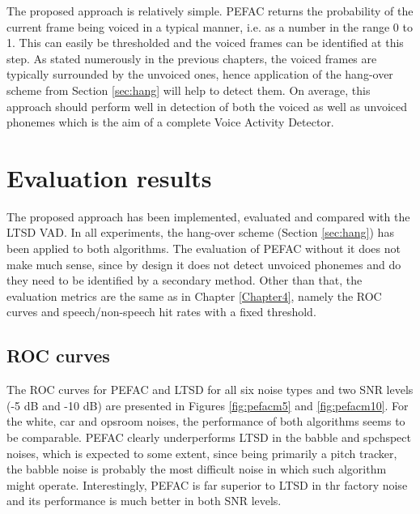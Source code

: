 The proposed approach is relatively simple. PEFAC returns the probability of the current frame being voiced in a typical manner, i.e. as a number in the range 0 to 1. This can easily be thresholded and the voiced frames can be identified at this step. As stated numerously in the previous chapters, the voiced frames are typically surrounded by the unvoiced ones, hence application of the hang-over scheme from Section \ref{sec:hang} will help to detect them. On average, this approach should perform well in detection of both the voiced as well as unvoiced phonemes which is the aim of a complete Voice Activity Detector.


\section{Evaluation results}

The proposed approach has been implemented, evaluated and compared with the LTSD VAD. In all experiments, the hang-over scheme (Section \ref{sec:hang}) has been applied to both algorithms. The evaluation of PEFAC without it does not make much sense, since by design it does not detect unvoiced phonemes and do they need to be identified by a secondary method. Other than that, the evaluation metrics are the same as in Chapter \ref{Chapter4}, namely the ROC curves and speech/non-speech hit rates with a fixed threshold.


\subsection{ROC curves}

The ROC curves for PEFAC and LTSD for all six noise types and two SNR levels (-5 dB and -10 dB) are presented in Figures \ref{fig:pefacm5} and \ref{fig:pefacm10}. For the white, car and opsroom noises, the performance of both algorithms seems to be comparable. PEFAC clearly underperforms LTSD in the babble and spchspect noises, which is expected to some extent, since being primarily a pitch tracker, the babble noise is probably the most difficult noise in which such algorithm might operate. Interestingly, PEFAC is far superior to LTSD in thr factory noise and its performance is much better in both SNR levels.

